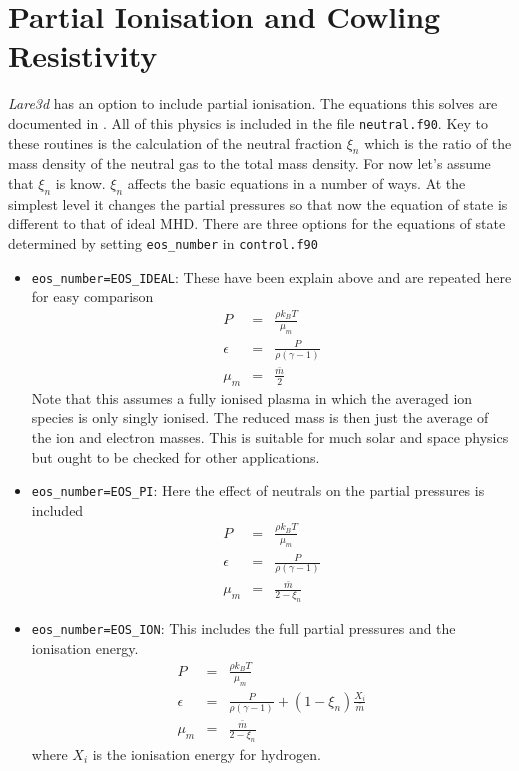 \documentclass[11pt]{article}
\begin{document}
\section{Partial Ionisation and Cowling Resistivity}
{\it Lare3d} has an option to include partial ionisation. The equations this solves are documented in \cite{flux-emergence}. All of this physics is included in the file \texttt{neutral.f90}. Key to these routines is the calculation of the neutral fraction $\xi_n$ which is the ratio of the mass density of the neutral gas to the total mass density. For now let's assume that $\xi_n$ is know. $\xi_n$ affects the basic equations in a number of ways. At the simplest level it changes the partial pressures so that now the equation of state is different to that of ideal MHD. There are three options for the equations of state determined by setting \texttt{eos\_number} in \texttt{control.f90} 
\begin{itemize}
\item \texttt{eos\_number=EOS\_IDEAL}: These have been explain above and are repeated here for easy comparison
\begin{eqnarray*}
P&=&\frac{\rho k_{B}T}{\mu_m}\\
\epsilon&=&\frac{P}{\rho(\gamma-1)}\\
\mu_m&=&\frac{\bar{m}}{2}
\end{eqnarray*}
Note that this assumes a fully ionised plasma in which the averaged ion species is only singly ionised. The reduced mass is then just the average of the ion and electron masses. This is suitable for much solar and space physics but ought to be checked for other applications.

\item \texttt{eos\_number=EOS\_PI}: Here the effect of neutrals on the partial pressures is included 
\begin{eqnarray*}
P&=&\frac{\rho k_{B}T}{\mu_m}\\
\epsilon&=&\frac{P}{\rho(\gamma-1)}\\
\mu_m&=&\frac{\bar{m}}{2-\xi_n}
\end{eqnarray*}

\item \texttt{eos\_number=EOS\_ION}: This includes the full partial pressures and the ionisation energy.
\begin{eqnarray*}
P&=&\frac{\rho k_{B}T}{\mu_m}\\
\epsilon&=&\frac{P}{\rho(\gamma-1)}+(1-\xi_n)\frac{X_i}{\bar{m}}\\
\mu_m&=&\frac{\bar{m}}{2-\xi_n}
\end{eqnarray*}
where $X_i$ is the ionisation energy for hydrogen.

\end{itemize}
\end{document}
